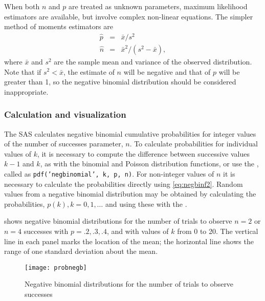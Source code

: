 When both $n$ and $p$ are treated as unknown parameters,
maximum likelihood estimators are available, but involve
complex non-linear equations.
The simpler method of moments estimators
are
\begin{eqnarray*}
  \hat{p} & = & \bar{x} / s^2 \\
  \hat{n} & = & \bar{x}^2 / ( s^2 - \bar{x} )
  \comma
\end{eqnarray*}
where $\bar{x}$ and $s^2$ are the sample mean and variance of the observed
distribution.
Note that if $s^2 < \bar{x}$, the estimate of $n$ will be negative
and that of $p$ will be greater than 1, so the negative binomial
distribution should be considered inappropriate.

\subsubsection{Calculation and visualization}
The SAS  calculates negative binomial cumulative probabilities for
integer values of the number of successes parameter, $n$.
To calculate probabilities for individual values of $k$, it is necessary
to compute the difference between successive values $k-1$ and $k$,
as with the binomial and Poisson distribution functions,
or use the , called as \texttt{pdf('negbinomial', k, p, n)}.
For non-integer values of $n$ it is necessary to calculate the probabilities
directly using \eqref{eq:negbinf2}.
Random values from a negative binomial distribution may be obtained by
calculating the probabilities, $p(k), k=0, 1, \dots$ and
using these with the .

 shows negative binomial distributions for the number of
trials to observe  $n=2$ or $n=4$ successes with $p = .2, .3, .4$, and
with values of $k$ from 0 to 20.
The vertical line in each panel marks the location of the mean; the horizontal
line shows the range of one standard deviation about the mean.

\begin{figure}[htb]
  \centering
  \texttt{[image: probnegb]}
  \caption{Negative binomial distributions for
        the number of trials to observe { successes}}%
  \label{fig:probnegb}
\end{figure}

